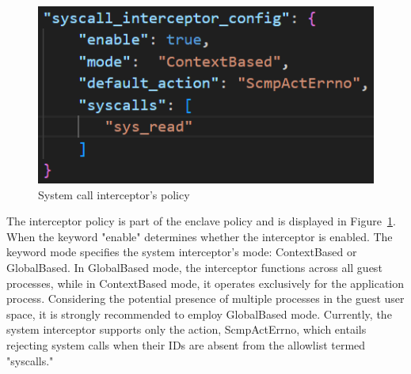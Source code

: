 \begin{figure}[!htb]
    \centering
    \includegraphics[scale=0.4]{images/policy_system_call.png}
    \caption[System call interceptor's policy]{System call interceptor's policy}
    \label{fig:policy_system_call}
\end{figure}

The interceptor policy is part of the enclave policy and is displayed in Figure~\ref{fig:policy_system_call}. When the keyword "enable" determines whether the interceptor is enabled. The keyword mode specifies the system interceptor's mode: ContextBased or GlobalBased. In GlobalBased mode, the interceptor 
functions across all guest processes, while in ContextBased mode, it operates exclusively for the application process. Considering the potential presence of multiple processes in the guest user space, it is strongly recommended to employ GlobalBased mode. Currently, the system 
interceptor supports only the action, ScmpActErrno, which entails rejecting system calls when their IDs are absent from the allowlist termed "syscalls."





